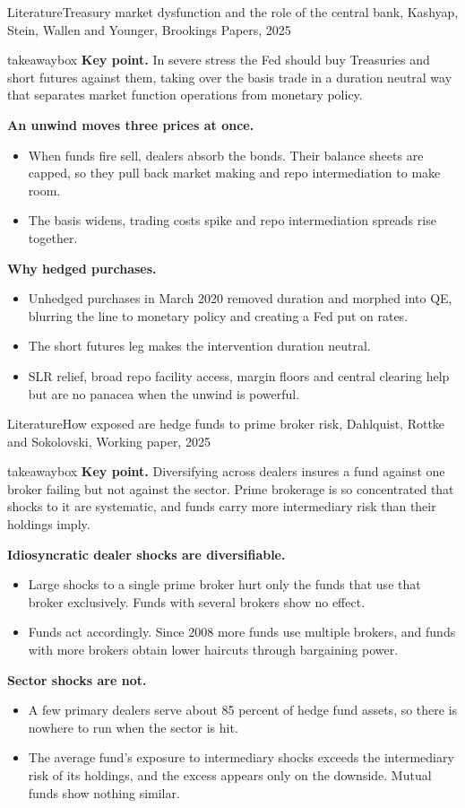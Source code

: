 \documentclass[aspectratio=169,11pt]{beamer}
\newcommand{\keypoint}[1]{%
  \begin{beamercolorbox}[sep=0.6em,wd=\textwidth]{takeawaybox}
    \textbf{Key point.} #1
  \end{beamercolorbox}}
\begin{document}
\begin{frame}{Literature}{Treasury market dysfunction and the role of the central bank, Kashyap, Stein, Wallen and Younger, Brookings Papers, 2025}
  \footnotesize
  \keypoint{In severe stress the Fed should buy Treasuries and short futures against them, taking over the basis trade in a duration neutral way that separates market function operations from monetary policy.}
  \medskip
  \textbf{An unwind moves three prices at once.}
  \begin{itemize}
    \item When funds fire sell, dealers absorb the bonds. Their balance sheets are capped, so they pull back market making and repo intermediation to make room.
    \item The basis widens, trading costs spike and repo intermediation spreads rise together.
  \end{itemize}
  \smallskip
  \textbf{Why hedged purchases.}
  \begin{itemize}
    \item Unhedged purchases in March 2020 removed duration and morphed into QE, blurring the line to monetary policy and creating a Fed put on rates.
    \item The short futures leg makes the intervention duration neutral.
    \item SLR relief, broad repo facility access, margin floors and central clearing help but are no panacea when the unwind is powerful.
  \end{itemize}
\end{frame}

\begin{frame}{Literature}{How exposed are hedge funds to prime broker risk, Dahlquist, Rottke and Sokolovski, Working paper, 2025}
  \footnotesize
  \keypoint{Diversifying across dealers insures a fund against one broker failing but not against the sector. Prime brokerage is so concentrated that shocks to it are systematic, and funds carry more intermediary risk than their holdings imply.}
  \medskip
  \textbf{Idiosyncratic dealer shocks are diversifiable.}
  \begin{itemize}
    \item Large shocks to a single prime broker hurt only the funds that use that broker exclusively. Funds with several brokers show no effect.
    \item Funds act accordingly. Since 2008 more funds use multiple brokers, and funds with more brokers obtain lower haircuts through bargaining power.
  \end{itemize}
  \smallskip
  \textbf{Sector shocks are not.}
  \begin{itemize}
    \item A few primary dealers serve about 85 percent of hedge fund assets, so there is nowhere to run when the sector is hit.
    \item The average fund's exposure to intermediary shocks exceeds the intermediary risk of its holdings, and the excess appears only on the downside. Mutual funds show nothing similar.
  \end{itemize}
\end{frame}
\end{document}
